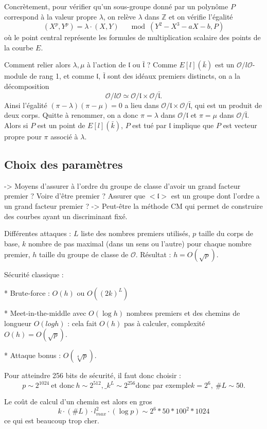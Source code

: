 \documentclass[11pt,a4paper]{article}
\newcommand{\Z}{\mathbb{Z}}
\renewcommand{\O}{\mathcal{O}}
\renewcommand{\frak}{\mathfrak}
\theoremstyle{definition}
\begin{document}
Concrètement, pour vérifier qu'un sous-groupe donné par un polynôme $P$ correspond à la valeur propre $\lambda$, on relève $\lambda$ dans $\Z$ et on vérifie l'égalité
$$ (X^p,Y^p)=\lambda\cdot (X,Y)\quad \mod (Y^2-X^3-aX-b, P)$$
où le point central représente les formules de multiplication scalaire des points de la courbe $E$.

Comment relier alors $\lambda,\mu$ à l'action de $\frak l$ ou $\bar{\frak l}$ ?
Comme $E[l](\bar{k})$ est un $\O/l\O$-module de rang 1, et comme $\frak l,\ \bar{\frak l}$ sont des idéaux premiers distincts, on a la décomposition
$$\O/l\O \simeq \O/\frak l \times \O/\bar{\frak l}.$$
Ainsi l'égalité $(\pi-\lambda)(\pi-\mu)=0$ a lieu dans $\O/\frak l \times \O/\bar{\frak l}$, qui est un produit de deux corps. Quitte à renommer, on a donc $\pi=\lambda$ dans $\O/\frak l$ et $\pi=\mu$ dans $\O/\bar{\frak l}$.
Alors si $P$ est un point de $E[l](\bar{k})$, $P$ est tué par $\frak l$ implique que $P$ est vecteur propre pour $\pi$ associé à $\lambda$.

\subsection{Choix des paramètres}

-> Moyens d'assurer à l'ordre du groupe de classe d'avoir un grand facteur premier ? Voire d'être premier ? Assurer que $<\frak l>$ est un groupe dont l'ordre a un grand facteur premier ?
-> Peut-être la méthode CM qui permet de construire des courbes ayant un discriminant fixé.

Différentes attaques :
$L$ liste des nombres premiers utilisés, $p$ taille du corps de base, $k$ nombre de pas maximal (dans un sens ou l'autre) pour chaque nombre premier, $h$ taille du groupe de classe de $\O$. Résultat : $h=O(\sqrt{p})$.

Sécurité classique :

* Brute-force : $O(h)$ ou $O((2k)^L)$

* Meet-in-the-middle avec $O(\log h)$ nombres premiers et des chemins de longueur $O(log h)$ : cela fait $O(h)$ pas à calculer, complexité $O(h)=O(\sqrt{p})$.

* Attaque bonus : $O(\sqrt[4]{p})$.

Pour atteindre 256 bits de sécurité, il faut donc choisir :
$$p\sim 2^{1024}\ \text{et donc}\ h\sim 2^{512},\_ k^L\sim 2^{256} \text{donc par exemple} k=2^6,\ \#L\sim 50.$$

Le coût de calcul d'un chemin est alors en gros
$$k\cdot(\#L)\cdot l_{max}^2\cdot (\log p)\sim 2^6*50*100^2*1024$$
ce qui est beaucoup trop cher.
\end{document}
